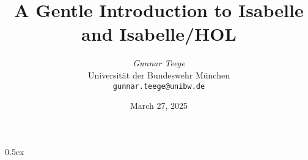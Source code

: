 \documentclass[11pt,a4paper]{report}
\begin{document}
\title{A Gentle Introduction to Isabelle\\ and Isabelle/HOL}
\author{{\em Gunnar Teege}\\
        Universität der Bundeswehr München \\
        \texttt{gunnar.teege@unibw.de}
}
\date{March 27, 2025}
\maketitle

\tableofcontents

\parindent 0pt\parskip 0.5ex



\begingroup
  \cleardoublepage
  
  
\endgroup

\printindex
\end{document}
